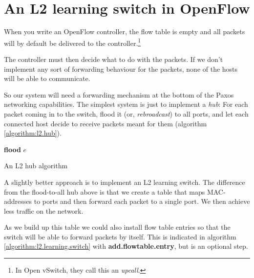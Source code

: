 \section{An L2 learning switch in OpenFlow}
\label{chapter:l2.learning.switch}

When you write an OpenFlow controller, the flow table is empty and all
packets will by default be delivered to the controller.\footnote{In Open
vSwitch, they call this an \textit{upcall}.}

The controller must then decide what to do with the packets.  If we don't
implement any sort of forwarding behaviour for the packets, none of the
hosts will be able to communicate.

So our system will need a forwarding mechanism at the bottom of the Paxos
networking capabilities.  The simplest system is just to implement a
\textit{hub}:  For each packet coming in to the switch, flood it
(or, \textit{rebroadcast}) to all ports, and let each
connected host decide to receive packets meant for them (algorithm
\ref{algorithm:l2.hub}).

\begin{algorithm}
  \begin{algorithmic}
      \State \textbf{flood} $e$ 
    \EndOn
  \end{algorithmic}
  \caption{An L2 hub algorithm}
  \label{algorithm:l2.hub}
\end{algorithm}

A slightly better approach is to implement an \ac{L2} learning
switch.
The difference from the flood-to-all hub above is that we create a table
that maps MAC-addresses to ports and then forward each packet to a single
port.  We then achieve less traffic on the network.

As we build up this table we could also install flow table entries so that the
switch will be able to forward packets by itself.  This is indicated in
algorithm \vref{algorithm:l2.learning.switch} with
\textbf{add.flowtable.entry}, but is an optional step.

